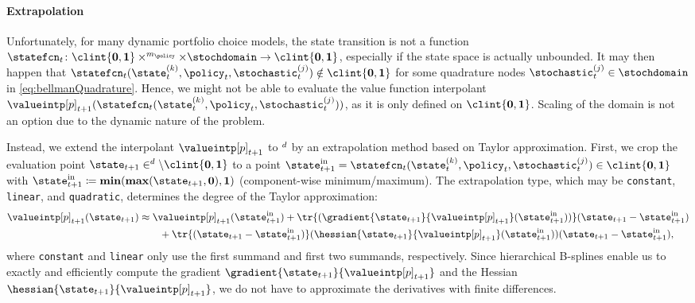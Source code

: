 \paragraph{Extrapolation}

Unfortunately, for many dynamic portfolio choice models,
the state transition is not a function
$\statefcn_t\colon \clint{\*0, \*1} \times \real^{m_{\policy}} \times
\stochdomain \to \clint{\*0, \*1}$,
especially if the state space is actually unbounded.
It may then happen that
$\statefcn_t(\state_t^{(k)}, \policy_t, \stochastic_t^{(j)})
\notin \clint{\*0, \*1}$
for some quadrature nodes
$\stochastic_t^{(j)} \in \stochdomain$ in \cref{eq:bellmanQuadrature}.
Hence, we might not be able to evaluate the value function interpolant
$\valueintp[p]_{t+1}(
  \statefcn_t(\state_t^{(k)}, \policy_t, \stochastic_t^{(j)})
)$, as it is only defined on $\clint{\*0, \*1}$.
Scaling of the domain is not an option due to the dynamic nature of
the problem.

Instead, we extend the interpolant $\valueintp[p]_{t+1}$
to $\real^d$ by an extrapolation method based on Taylor approximation.
First, we crop the evaluation point
$\state_{t+1} \in \real^d \setminus \clint{\*0, \*1}$ to a point
$
  \state_{t+1}^\mathrm{in}
  = \statefcn_t(\state_t^{(k)}, \policy_t, \stochastic_t^{(j)})
  \in \clint{\*0, \*1}
$
with $\state_{t+1}^\mathrm{in} \ceq \vecmin(\vecmax(\state_{t+1}, \*0), \*1)$
(component-wise minimum/maximum).
The extrapolation type,
which may be \texttt{constant}, \texttt{linear}, and \texttt{quadratic},
determines the degree of the Taylor approximation:
\begin{equation}
  \begin{split}
    \valueintp[p]_{t+1}(\state_{t+1})
    &\approx \valueintp[p]_{t+1}(\state_{t+1}^\mathrm{in}) +
    \tr{(\gradient{\state_{t+1}}{\valueintp[p]_{t+1}}(\state_{t+1}^\mathrm{in}))}
    (\state_{t+1} - \state_{t+1}^\mathrm{in})\\
    &\qquad + \tr{(\state_{t+1} - \state_{t+1}^\mathrm{in})}
    (\hessian{\state_{t+1}}{\valueintp[p]_{t+1}}(\state_{t+1}^\mathrm{in}))
    (\state_{t+1} - \state_{t+1}^\mathrm{in}),
  \end{split}
\end{equation}
where \texttt{constant} and \texttt{linear}
only use the first summand and first two summands, respectively.
Since hierarchical B-splines enable us to
exactly and efficiently compute
the gradient $\gradient{\state_{t+1}}{\valueintp[p]_{t+1}}$ and
the Hessian $\hessian{\state_{t+1}}{\valueintp[p]_{t+1}}$,
we do not have to approximate the derivatives with finite differences.



